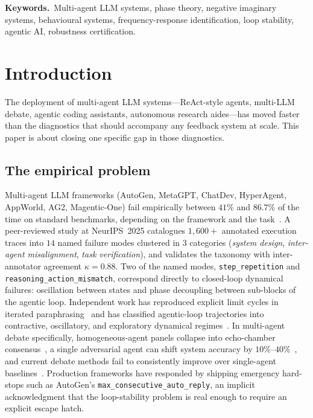 \documentclass[11pt,a4paper]{article}
\theoremstyle{definition}
\theoremstyle{remark}
\begin{document}
\medskip
\noindent\textbf{Keywords.}~Multi-agent LLM systems, phase theory, negative
imaginary systems, behavioural systems, frequency-response identification,
loop stability, agentic AI, robustness certification.

\section{Introduction}\label{sec:intro}

The deployment of multi-agent LLM systems---ReAct-style agents, multi-LLM
debate, agentic coding assistants, autonomous research aides---has moved
faster than the diagnostics that should accompany any feedback system at
scale.  This paper is about closing one specific gap in those diagnostics.

\subsection{The empirical problem}

Multi-agent LLM frameworks (AutoGen, MetaGPT, ChatDev, HyperAgent,
AppWorld, AG2, Magentic-One)  fail empirically between $41\%$ and $86.7\%$
of the time on standard benchmarks, depending on the framework and the
task~\citep{Cemri2025MAST}. A peer-reviewed study at NeurIPS~2025 catalogues
$1{,}600+$ annotated execution traces into $14$ named failure modes
clustered in $3$ categories (\emph{system design}, \emph{inter-agent
misalignment}, \emph{task verification}), and validates the taxonomy with
inter-annotator agreement $\kappa = 0.88$.  Two of the named modes,
\texttt{step\_repetition} and \texttt{reasoning\_action\_mismatch},
correspond directly to closed-loop dynamical failures: oscillation between
states and phase decoupling between sub-blocks of the agentic loop.
Independent work has reproduced explicit limit cycles in iterated
paraphrasing~\citep{Wang2025AttractorCycles} and has classified agentic-loop
trajectories into contractive, oscillatory, and exploratory dynamical
regimes~\citep{Tacheny2025AgenticLoops}.  In multi-agent debate
specifically, homogeneous-agent panels collapse into echo-chamber
consensus~\citep{Oh2025BeliefEntrenchment}, a single adversarial agent
can shift system accuracy by $10\%$--$40\%$~\citep{Sci2026PersuasionFailure},
and current debate methods fail to consistently improve over single-agent
baselines~\citep{ICLRBlog2025MAD}.  Production frameworks have responded by
shipping emergency hard-stops such as AutoGen's
\texttt{max\_consecutive\_auto\_reply}, an implicit acknowledgment that the
loop-stability problem is real enough to require an explicit escape hatch.
\end{document}
